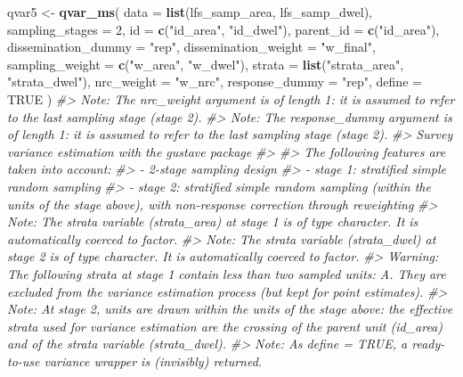 \documentclass[
]{article}
\newenvironment{Shaded}{\begin{snugshade}}{\end{snugshade}}
\newcommand{\AttributeTok}[1]{\textcolor[rgb]{0.13,0.29,0.53}{#1}}
\newcommand{\CommentTok}[1]{\textcolor[rgb]{0.56,0.35,0.01}{\textit{#1}}}
\newcommand{\ConstantTok}[1]{\textcolor[rgb]{0.56,0.35,0.01}{#1}}
\newcommand{\DecValTok}[1]{\textcolor[rgb]{0.00,0.00,0.81}{#1}}
\newcommand{\FunctionTok}[1]{\textcolor[rgb]{0.13,0.29,0.53}{\textbf{#1}}}
\newcommand{\NormalTok}[1]{#1}
\newcommand{\OtherTok}[1]{\textcolor[rgb]{0.56,0.35,0.01}{#1}}
\newcommand{\StringTok}[1]{\textcolor[rgb]{0.31,0.60,0.02}{#1}}
\begin{document}
\begin{Shaded}
\begin{Highlighting}[]
\NormalTok{qvar5 }\OtherTok{\textless{}{-}} \FunctionTok{qvar\_ms}\NormalTok{(}
  \AttributeTok{data =} \FunctionTok{list}\NormalTok{(lfs\_samp\_area, lfs\_samp\_dwel),}
  \AttributeTok{sampling\_stages =} \DecValTok{2}\NormalTok{,}
  \AttributeTok{id =} \FunctionTok{c}\NormalTok{(}\StringTok{"id\_area"}\NormalTok{, }\StringTok{"id\_dwel"}\NormalTok{),}
  \AttributeTok{parent\_id =} \FunctionTok{c}\NormalTok{(}\StringTok{"id\_area"}\NormalTok{),}
  \AttributeTok{dissemination\_dummy =} \StringTok{"rep"}\NormalTok{,}
  \AttributeTok{dissemination\_weight =} \StringTok{"w\_final"}\NormalTok{,}
  \AttributeTok{sampling\_weight =} \FunctionTok{c}\NormalTok{(}\StringTok{"w\_area"}\NormalTok{, }\StringTok{"w\_dwel"}\NormalTok{),}
  \AttributeTok{strata =} \FunctionTok{list}\NormalTok{(}\StringTok{"strata\_area"}\NormalTok{, }\StringTok{"strata\_dwel"}\NormalTok{),}
  \AttributeTok{nrc\_weight =} \StringTok{"w\_nrc"}\NormalTok{,}
  \AttributeTok{response\_dummy =} \StringTok{"rep"}\NormalTok{,}
  \AttributeTok{define =} \ConstantTok{TRUE}
\NormalTok{)}
\CommentTok{\#\textgreater{} Note: The nrc\_weight argument is of length 1: it is assumed to refer to the last sampling stage (stage 2).}
\CommentTok{\#\textgreater{} Note: The response\_dummy argument is of length 1: it is assumed to refer to the last sampling stage (stage 2).}
\CommentTok{\#\textgreater{} Survey variance estimation with the gustave package}
\CommentTok{\#\textgreater{} }
\CommentTok{\#\textgreater{} The following features are taken into account:}
\CommentTok{\#\textgreater{}   {-} 2{-}stage sampling design}
\CommentTok{\#\textgreater{}   {-} stage 1: stratified simple random sampling}
\CommentTok{\#\textgreater{}   {-} stage 2: stratified simple random sampling (within the units of the stage above), with non{-}response correction through reweighting}
\CommentTok{\#\textgreater{} Note: The strata variable (strata\_area) at stage 1 is of type character. It is automatically coerced to factor.}
\CommentTok{\#\textgreater{} Note: The strata variable (strata\_dwel) at stage 2 is of type character. It is automatically coerced to factor.}
\CommentTok{\#\textgreater{} Warning: The following strata at stage 1 contain less than two sampled units: A. They are excluded from the variance estimation process (but kept for point estimates).}
\CommentTok{\#\textgreater{} Note: At stage 2, units are drawn within the units of the stage above: the effective strata used for variance estimation are the crossing of the parent unit (id\_area) and of the strata variable (strata\_dwel).}
\CommentTok{\#\textgreater{} Note: As define = TRUE, a ready{-}to{-}use variance wrapper is (invisibly) returned.}
\end{Highlighting}
\end{Shaded}
\end{document}
